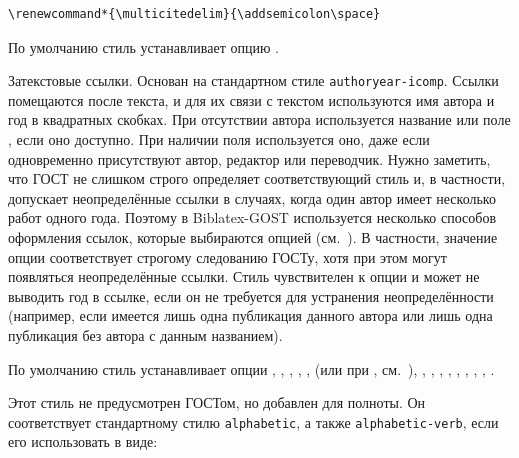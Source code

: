 \documentclass[10pt,a4paper,headings=small,numbers=enddot,english,russian]{ltxdockit}
\newcommand*{\biblatexgost}{Biblatex-GOST\xspace}
\newcommand*{\bibsty}{\texttt}
\begin{document}
\begin{marglist}
\begin{lstlisting}[style=latex]
\renewcommand*{\multicitedelim}{\addsemicolon\space}
\end{lstlisting}

По умолчанию стиль устанавливает опцию %
.

\item[gost-authoryear]
Затекстовые ссылки. Основан на стандартном
стиле \bibsty{authoryear-icomp}. Ссылки помещаются после текста, и для их связи
с текстом используются имя автора и год в квадратных скобках. 
При отсутствии автора
используется название или поле , если оно доступно.
При наличии поля  используется оно, даже если одновременно присутствуют
автор, редактор или переводчик. Нужно заметить, что ГОСТ
не слишком строго определяет соответствующий стиль и, в частности, допускает неопределённые
ссылки в случаях, когда один автор имеет несколько
работ одного года. Поэтому в \biblatexgost используется несколько способов оформления
ссылок, которые выбираются опцией  (см.~).
В частности, значение опции  соответствует строгому
следованию ГОСТу, хотя при этом могут появляться неопределённые ссылки.
  Стиль чувствителен к опции  и может не выводить
  год в ссылке, если он не требуется для устранения неопределённости (например, если
  имеется лишь одна публикация данного автора или лишь одна публикация без автора с данным
  названием).

По умолчанию стиль устанавливает опции %
, %
, %
, %
, %
,
(или  при ,
см.~), %
, %
, %
, %
, %
, %
, %
, %
, %
.

\item[gost-alphabetic] %
Этот стиль не предусмотрен ГОСТом, но добавлен для полноты. Он соответствует стандартному
стилю \bibsty{alphabetic}, а также \bibsty{alphabetic-verb}, если его использовать в виде:

\begin{ltxcode}
\usepackage[%
    citestyle=alphabetic-verb,
    bibstyle=gost-alphabetic,
    ...
]{biblatex}
\end{ltxcode}


\end{marglist}
\end{document}

